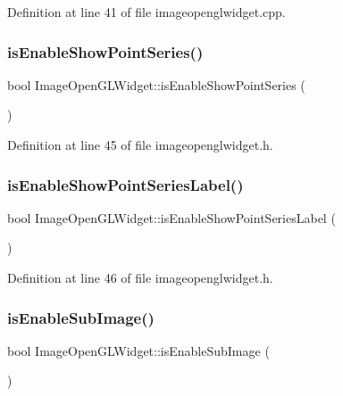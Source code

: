 Definition at line 41 of file imageopenglwidget.\+cpp.

\mbox{\label{class_image_open_g_l_widget_a05ea8cde0274873838b869a85236bcb1}} 
\subsubsection{\texorpdfstring{isEnableShowPointSeries()}{isEnableShowPointSeries()}}
{\footnotesize\ttfamily bool Image\+Open\+G\+L\+Widget\+::is\+Enable\+Show\+Point\+Series (\begin{DoxyParamCaption}{ }\end{DoxyParamCaption})\hspace{0.3cm}{\ttfamily [inline]}}



Definition at line 45 of file imageopenglwidget.\+h.

\mbox{\label{class_image_open_g_l_widget_a71009f85668eac77fb4901c00785d369}} 
\subsubsection{\texorpdfstring{isEnableShowPointSeriesLabel()}{isEnableShowPointSeriesLabel()}}
{\footnotesize\ttfamily bool Image\+Open\+G\+L\+Widget\+::is\+Enable\+Show\+Point\+Series\+Label (\begin{DoxyParamCaption}{ }\end{DoxyParamCaption})\hspace{0.3cm}{\ttfamily [inline]}}



Definition at line 46 of file imageopenglwidget.\+h.

\mbox{\label{class_image_open_g_l_widget_a97e1cefaf5e7a103f869e6ab2bdef80f}} 
\subsubsection{\texorpdfstring{isEnableSubImage()}{isEnableSubImage()}}
{\footnotesize\ttfamily bool Image\+Open\+G\+L\+Widget\+::is\+Enable\+Sub\+Image (\begin{DoxyParamCaption}{ }\end{DoxyParamCaption})\hspace{0.3cm}{\ttfamily [inline]}}



